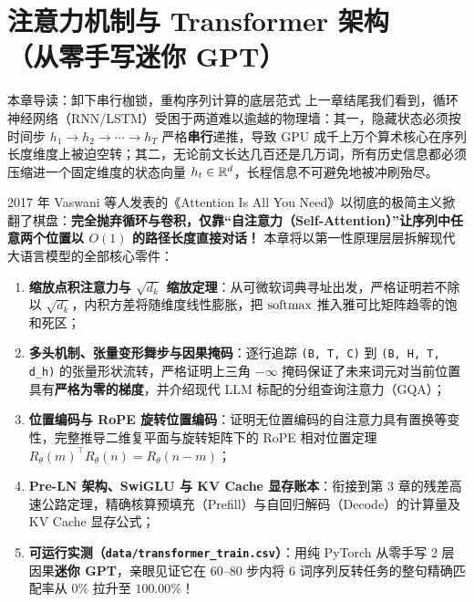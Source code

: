 \chapter[注意力机制与 Transformer 架构]{注意力机制与 Transformer 架构\\（从零手写迷你 GPT）}
\label{ch:attention-transformer}


\begin{chapIntro}{本章导读：卸下串行枷锁，重构序列计算的底层范式}
上一章结尾我们看到，循环神经网络（RNN/LSTM）受困于两道难以逾越的物理墙：其一，隐藏状态必须按时间步 $h_1 \to h_2 \to \cdots \to h_T$ 严格\textbf{串行}递推，导致 GPU 成千上万个算术核心在序列长度维度上被迫空转；其二，无论前文长达几百还是几万词，所有历史信息都必须压缩进一个固定维度的状态向量 $h_t \in \mathbb{R}^d$，长程信息不可避免地被冲刷殆尽。

2017 年 Vaswani 等人发表的《Attention Is All You Need》以彻底的极简主义掀翻了棋盘：\textbf{完全抛弃循环与卷积，仅靠“自注意力（Self-Attention）”让序列中任意两个位置以 $O(1)$ 的路径长度直接对话！} 本章将以第一性原理层层拆解现代大语言模型的全部核心零件：
\begin{enumerate}
  \item \textbf{缩放点积注意力与 $\sqrt{d_k}$ 缩放定理}：从可微软词典寻址出发，严格证明若不除以 $\sqrt{d_k}$，内积方差将随维度线性膨胀，把 $\operatorname{softmax}$ 推入雅可比矩阵趋零的饱和死区；
  \item \textbf{多头机制、张量变形舞步与因果掩码}：逐行追踪 \texttt{(B, T, C)} 到 \texttt{(B, H, T, d\_h)} 的张量形状流转，严格证明上三角 $-\infty$ 掩码保证了未来词元对当前位置具有\textbf{严格为零的梯度}，并介绍现代 LLM 标配的分组查询注意力（GQA）；
  \item \textbf{位置编码与 RoPE 旋转位置编码}：证明无位置编码的自注意力具有置换等变性，完整推导二维复平面与旋转矩阵下的 RoPE 相对位置定理 $R_\theta(m)^\top R_\theta(n) = R_\theta(n - m)$；
  \item \textbf{Pre-LN 架构、SwiGLU 与 KV Cache 显存账本}：衔接到第 3 章的残差高速公路定理，精确核算预填充（Prefill）与自回归解码（Decode）的计算量及 KV Cache 显存公式；
  \item \textbf{可运行实测（\texttt{data/transformer\_train.csv}）}：用纯 PyTorch 从零手写 2 层因果\textbf{迷你 GPT}，亲眼见证它在 60--80 步内将 6 词序列反转任务的整句精确匹配率从 $0\%$ 拉升至 $100.00\%$！
\end{enumerate}
\end{chapIntro}

